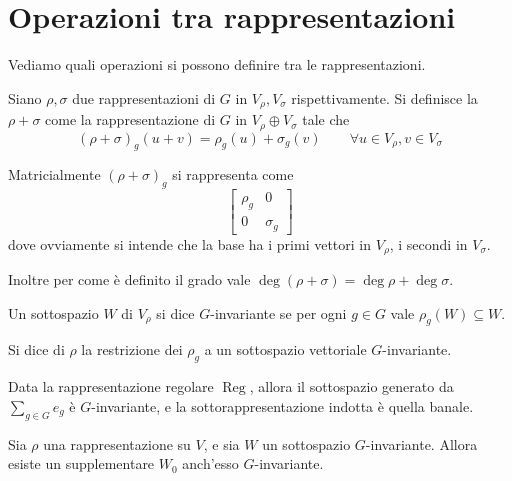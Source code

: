 \documentclass[a4paper,10pt,oneside]{math_article}
\DeclareMathOperator{\Reg}{Reg}
\begin{document}
  \section{Operazioni tra rappresentazioni}
    Vediamo quali operazioni si possono definire tra le rappresentazioni.
    
    \begin{mydef}
     Siano $\rho, \sigma$ due rappresentazioni di $G$ in $V_\rho,V_\sigma$ rispettivamente. Si definisce la  $\rho+\sigma$ come la rappresentazione di $G$ in $V_\rho\oplus V_\sigma$ tale che 
     \[
      (\rho+\sigma)_g(u+v)=\rho_g(u)+\sigma_g(v)\qquad \forall u\in V_\rho, v\in V_\sigma
     \]
    \end{mydef}
    
    Matricialmente $(\rho+\sigma)_g$ si rappresenta come
    \[
     \left[\begin{array}{c|c}
	    \rho_g & 0 \\
	    \hline
	    0 & \sigma_g
           \end{array}
     \right]
    \]
    dove ovviamente si intende che la base ha i primi vettori in $V_\rho$, i secondi in $V_\sigma$.
    
    Inoltre per come è definito il grado vale $\deg(\rho+\sigma)=\deg\rho+\deg\sigma$.
    
    \begin{mydef}
     Un sottospazio $W$ di $V_\rho$ si dice $G$-invariante se per ogni $g\in G$ vale $\rho_g(W)\subseteq W$.
    \end{mydef}

    \begin{mydef}
     Si dice  di $\rho$ la restrizione dei $\rho_g$ a un sottospazio vettoriale $G$-invariante.
    \end{mydef}
    
    \begin{myexample}
      Data la rappresentazione regolare $\Reg$, allora il sottospazio generato da $\sum_{g\in G} e_g$ è $G$-invariante, e la sottorappresentazione indotta è quella banale.
    \end{myexample}
    
    \begin{mytheorem}\label{Th:SupplInv}
     Sia $\rho$ una rappresentazione su $V$, e sia $W$ un sottospazio $G$-invariante. Allora esiste un supplementare $W_0$ anch'esso $G$-invariante.
    \end{mytheorem}
    
\end{document}
